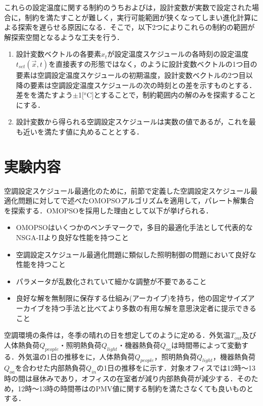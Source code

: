 これらの設定温度に関する制約のうちおよびは，設計変数が実数で設定された場合に，制約を満たすことが難しく，実行可能範囲が狭くなってしまい進化計算による探索を遅らせる原因になる．そこで，以下2つによりこれらの制約の範囲が解探索空間となるような工夫を行う．
\begin{enumerate}
  \item 設計変数ベクトルの各要素$x_t$が設定温度スケジュールの各時刻の設定温度$t_{set}(\vec{x},t)$を直接表すの形態ではなく，のように設計変数ベクトルの1つ目の要素は空調設定温度スケジュールの初期温度，設計変数ベクトルの2つ目以降の要素は空調設定温度スケジュールの次の時刻との差を示すものとする．差をを満たすよう$\pm$1[$^o$C]とすることで，制約範囲内の解のみを探索することにする．
  \item 設計変数から得られる空調設定スケジュールは実数の値であるが，これを最も近いを満たす値に丸めることとする．
\end{enumerate}

\section{実験内容}\label{sec::math_setting}
空調設定スケジュール最適化のために，前節で定義した空調設定スケジュール最適化問題に対してで述べたOMOPSOアルゴリズムを適用して，パレート解集合を探索する．OMOPSOを採用した理由として以下が挙げられる．

\begin{itemize}
  \item OMOPSOはいくつかのベンチマークで，多目的最適化手法として代表的なNSGA-IIより良好な性能を持つこと\cite{Godinez10}
  \item 空調設定スケジュール最適化問題に類似した照明制御の問題において良好な性能を持つこと\cite{Ohta13}
  \item パラメータが乱数化されていて細かな調整が不要であること
  \item 良好な解を無制限に保存する仕組み(アーカイブ)を持ち，他の固定サイズアーカイブを持つ手法と比べてより多数の有用な解を意思決定者に提示できること
\end{itemize}

空調環境の条件は，冬季の晴れの日を想定してのように定める．外気温$T_{out}$及び人体熱負荷$Q_{people}$・照明熱負荷$Q_{light}$・機器熱負荷$Q_{oa}$は時間帯によって変動する．外気温の1日の推移をに，人体熱負荷$Q_{people}$，照明熱負荷$Q_{light}$，機器熱負荷$Q_{oa}$を合わせた内部熱負荷$Q_{in}$の1日の推移をに示す．対象オフィスでは12時～13時の間は昼休みであり，オフィスの在室者が減り内部熱負荷が減少する．そのため，12時～13時の時間帯はのPMV値に関する制約を満たさなくても良いものとする．

